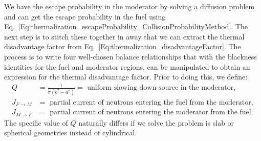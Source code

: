 We have the escape probability in the moderator by solving a diffusion problem and can get the escape probability in the fuel using Eq.~\eqref{Eq:thermalization_escapeProbability_CollisionProbabilityMethod}. The next step is to stitch these together in away that we can extract the thermal disadvantage factor from Eq.~\eqref{Eq:thermalization_disadvantageFactor}. The process is to write four well-chosen balance relationships that with the blackness identities for the fuel and moderator regions, can be manipulated to obtain an expression for the thermal disadvantage factor. Prior to doing this, we define:
\begin{align}
  Q &= \frac{1}{\pi (b^2 - a^2)} = \text{ uniform slowing down source in the moderator}, \nonumber \\
  J_{F \rightarrow M} &= \text{ partial current of neutrons entering the fuel from the moderator}, \nonumber \\
  J_{M \rightarrow F} &= \text{ partial current of neutrons entering the moderator from the fuel}. \nonumber
\end{align}
The specific value of $Q$ naturally differs if we solve the problem is slab or spherical geometries instead of cylindrical.

